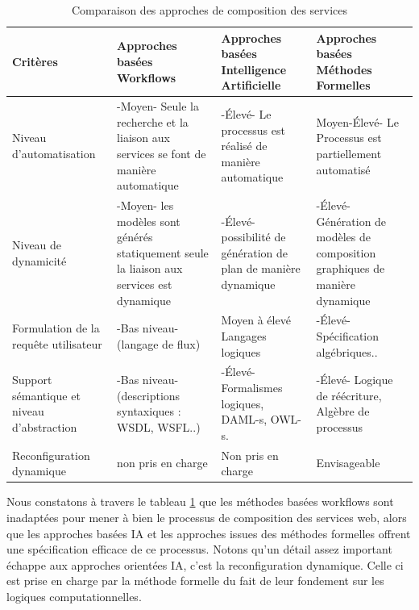 \begin{table}[h]
\centering
\caption{Comparaison des approches de composition des services}
\label{tab:criteres-approches}
\begin{tabular}{|p{3.5cm}|p{3.5cm}|p{3.5cm}|p{3.5cm}|}
\hline
\rowcolor{gray!30}
\textbf{Critères} & \textbf{Approches basées Workflows} & \textbf{Approches basées Intelligence Artificielle} & \textbf{Approches basées Méthodes Formelles} \\
\hline
Niveau d'automatisation & -Moyen- Seule la recherche et la liaison aux services se font de manière automatique & -Élevé- Le processus est réalisé de manière automatique & Moyen-Élevé- Le Processus est partiellement automatisé \\
\hline
Niveau de dynamicité & -Moyen- les modèles sont générés statiquement seule la liaison aux services est dynamique & -Élevé- possibilité de génération de plan de manière dynamique & -Élevé- Génération de modèles de composition graphiques de manière dynamique \\
\hline
Formulation de la requête utilisateur & -Bas niveau- (langage de flux) & Moyen à élevé Langages logiques & -Élevé- Spécification algébriques.. \\
\hline
Support sémantique et niveau d'abstraction & -Bas niveau- (descriptions syntaxiques : WSDL, WSFL..) & -Élevé- Formalismes logiques, DAML-s, OWL-s. & -Élevé- Logique de réécriture, Algèbre de processus \\
\hline
Reconfiguration dynamique & non pris en charge & Non pris en charge & Envisageable \\
\hline
\end{tabular}
\end{table}

Nous constatons à travers le tableau \ref{tab:criteres-approches} que les méthodes basées workflows sont inadaptées pour mener à bien le processus de composition des services web, alors que les approches basées IA et les approches issues des méthodes formelles offrent une spécification efficace de ce processus. Notons qu'un détail assez important échappe aux approches orientées IA, c'est la reconfiguration dynamique. Celle ci est prise en charge par la méthode formelle du fait de leur fondement sur les logiques computationnelles.

